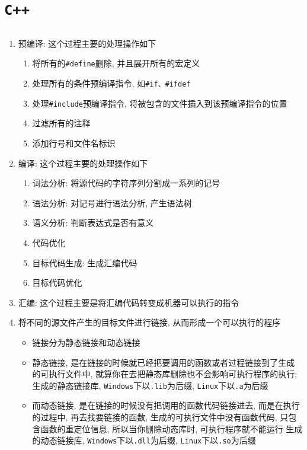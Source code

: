\newpage
\setcounter{page}{1}
\chapter{\tt C++}
\thispagestyle{fancy}
\section{\color{blue}{基础}}

\subsection{}
\begin{enumerate}
	\item 预编译: 这个过程主要的处理操作如下
	\begin{enumerate}
		\item 将所有的{\tt \#define}删除, 并且展开所有的宏定义
		\item 处理所有的条件预编译指令, 如{\tt \#if、\#ifdef}
		\item 处理{\tt \#include}预编译指令, 将被包含的文件插入到该预编译指令的位置
		\item 过滤所有的注释
		\item 添加行号和文件名标识
	\end{enumerate}
	\item 编译: 这个过程主要的处理操作如下
	\begin{enumerate}
		\item 词法分析: 将源代码的字符序列分割成一系列的记号
		\item 语法分析: 对记号进行语法分析, 产生语法树
		\item 语义分析: 判断表达式是否有意义
		\item 代码优化
		\item 目标代码生成: 生成汇编代码
		\item 目标代码优化
	\end{enumerate}
	\item 汇编: 这个过程主要是将汇编代码转变成机器可以执行的指令
	\item 将不同的源文件产生的目标文件进行链接, 从而形成一个可以执行的程序
	\begin{itemize}
		\item 链接分为静态链接和动态链接
		\item 静态链接, 是在链接的时候就已经把要调用的函数或者过程链接到了生成的可执行文件中, 
				就算你在去把静态库删除也不会影响可执行程序的执行; 生成的静态链接库, {\tt Windows}下以{\tt .lib}为后缀, 
				{\tt Linux}下以{\tt .a}为后缀
		\item 而动态链接, 是在链接的时候没有把调用的函数代码链接进去, 而是在执行的过程中, 再去找要链接的函数, 
				生成的可执行文件中没有函数代码, 只包含函数的重定位信息, 所以当你删除动态库时, 可执行程序就不能运行
				生成的动态链接库, {\tt Windows}下以{\tt .dll}为后缀, {\tt Linux}下以{\tt .so}为后缀
	\end{itemize}
\end{enumerate}
